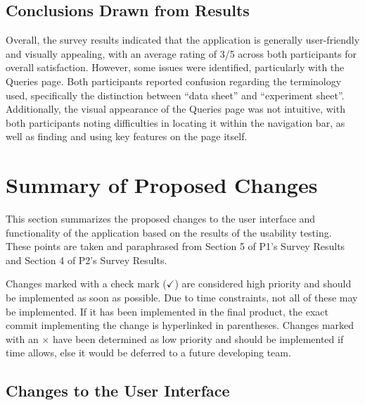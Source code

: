 \documentclass{article}
\begin{document}
\subsection{Conclusions Drawn from Results}
Overall, the survey results indicated that the application is generally
user-friendly and visually appealing, with an average rating of 3/5 across both
participants for overall satisfaction.
However, some issues were identified, particularly with the Queries page. Both
participants reported confusion regarding the terminology used, specifically the
distinction between ``data sheet'' and ``experiment sheet''. Additionally, the
visual appearance of the Queries page was not intuitive, with both participants
noting difficulties in locating it within the navigation bar, as well as finding
and using key features on the page itself.

\section{Summary of Proposed Changes}
This section summarizes the proposed changes to the user interface and
functionality of the application based on the results of the usability testing.
These points are taken and paraphrased from Section 5 of P1's Survey Results and
Section 4 of P2's Survey Results. 

Changes marked with a check mark ($\checkmark$) are considered high priority and
should be implemented as soon as possible. Due to time constraints, not all of
these may be implemented. If it has been implemented in the final product, the
exact commit implementing the change is hyperlinked in parentheses. Changes
marked with an $\times$ have been determined as low priority and should be
implemented if time allows, else it would be deferred to a future developing
team.

\subsection{Changes to the User Interface}
\end{document}
